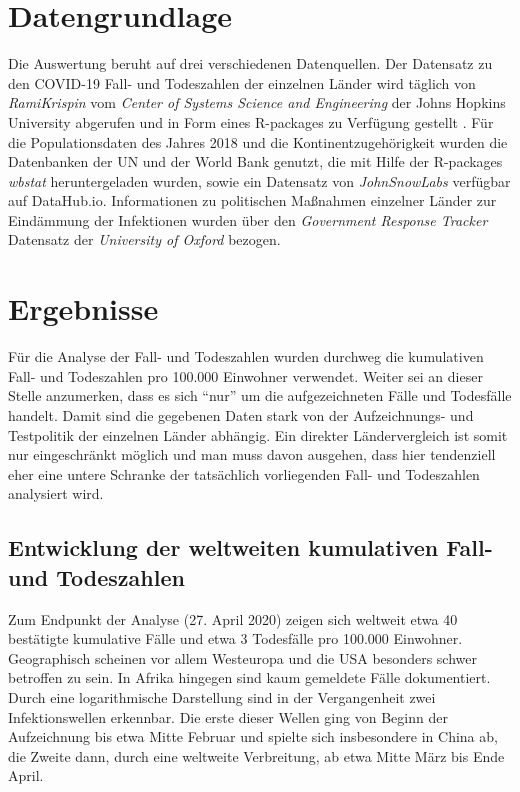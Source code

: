 \documentclass[12pt, a4paper]{article}
\begin{document}
\section{Datengrundlage}
Die Auswertung beruht auf drei verschiedenen Datenquellen. Der Datensatz zu den COVID-19 Fall- und Todeszahlen der einzelnen Länder wird täglich von \emph{RamiKrispin} vom \emph{Center of Systems Science and Engineering} der Johns Hopkins University abgerufen und in Form eines R-packages zu Verfügung gestellt \cite{COVID}.
Für die Populationsdaten des Jahres 2018 und die Kontinentzugehörigkeit wurden die Datenbanken der UN und der World Bank genutzt, die mit Hilfe der R-packages \emph{wbstat} heruntergeladen wurden, sowie ein Datensatz von \emph{JohnSnowLabs} \cite{GEO} verfügbar auf DataHub.io.
Informationen zu politischen Maßnahmen einzelner Länder zur Eindämmung der Infektionen wurden über den \emph{Government Response Tracker} Datensatz der \emph{University of Oxford} \cite{OxGRT} bezogen.

\section{Ergebnisse}
Für die Analyse der Fall- und Todeszahlen wurden durchweg die kumulativen Fall- und Todeszahlen pro 100.000 Einwohner verwendet. Weiter sei an dieser Stelle anzumerken, dass es sich ``nur'' um die aufgezeichneten Fälle und Todesfälle handelt. Damit sind die gegebenen Daten stark von der Aufzeichnungs- und Testpolitik der einzelnen Länder abhängig. Ein direkter Ländervergleich ist somit nur eingeschränkt möglich und man muss davon ausgehen, dass hier tendenziell eher eine untere Schranke der tatsächlich vorliegenden Fall- und Todeszahlen analysiert wird. 
\subsection{Entwicklung der weltweiten kumulativen Fall- und Todeszahlen}
Zum Endpunkt der Analyse (27. April 2020) zeigen sich weltweit etwa 40 bestätigte kumulative Fälle und etwa 3 Todesfälle pro 100.000 Einwohner. Geographisch scheinen vor allem Westeuropa und die USA besonders schwer betroffen zu sein. In Afrika hingegen sind kaum gemeldete Fälle dokumentiert. Durch eine logarithmische Darstellung sind in der Vergangenheit zwei Infektionswellen erkennbar. Die erste dieser Wellen ging von Beginn der Aufzeichnung bis etwa Mitte Februar und spielte sich insbesondere in China ab, die Zweite dann, durch eine weltweite Verbreitung, ab etwa Mitte März bis Ende April.
\end{document}
